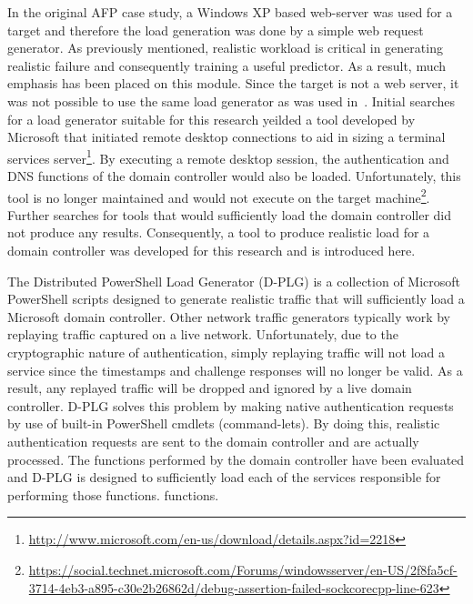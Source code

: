 In the original AFP case study, a Windows XP based web-server was used for a
target and therefore the load generation was done by a simple web request
generator.  As previously mentioned, realistic workload is critical in
generating realistic failure and consequently training a useful predictor.  As
a result, much emphasis has been placed on this module.  Since the target is
not a web server, it was not possible to use the same load generator as was
used in~\cite{irrera2015}.  Initial searches for a load generator suitable for
this research yeilded a tool developed by Microsoft that initiated remote
desktop connections to aid in sizing a terminal services
server\footnote{\url{http://www.microsoft.com/en-us/download/details.aspx?id=2218}}.
By executing a remote desktop session, the authentication and DNS functions of
the domain controller would also be loaded.  Unfortunately, this tool is no
longer maintained and would not execute on the target
machine\footnote{\url{https://social.technet.microsoft.com/Forums/windowsserver/en-US/2f8fa5cf-3714-4eb3-a895-c30e2b26862d/debug-assertion-failed-sockcorecpp-line-623}}.
Further searches for tools that would sufficiently load the domain controller
did not produce any results.  Consequently, a tool to produce realistic load
for a domain controller was developed for this research and is introduced here.


The Distributed PowerShell Load Generator (D-PLG) is a collection of Microsoft
PowerShell scripts designed to generate realistic traffic that will
sufficiently load a Microsoft domain controller.  Other network traffic
generators typically work by replaying traffic captured on a live network.
Unfortunately, due to the cryptographic nature of authentication, simply
replaying traffic will not load a service since the timestamps and challenge
responses will no longer be valid.  As a result, any replayed traffic will be
dropped and ignored by a live domain controller.  D-PLG solves this problem by
making native authentication requests by use of built-in PowerShell cmdlets
(command-lets).  By doing this, realistic authentication requests are sent to
the domain controller and are actually processed.  The functions performed by
the domain controller have been evaluated and D-PLG is designed to sufficiently
load each of the services responsible for performing those functions.
functions.

